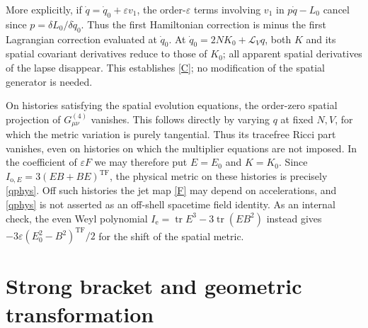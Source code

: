 \documentclass[11pt]{article}
\newcommand{\TF}{\mathop{\mathrm{TF}}}
\newcommand{\Lie}{\mathcal L}
\newcommand{\tr}{\operatorname{tr}}
\newcommand{\ep}{\varepsilon}
\begin{document}
More explicitly, if \(\dot q=\dot q_0+\ep v_1\), the order-\(\ep\) terms involving \(v_1\) in \(p\dot q-L_0\) cancel since \(p=\delta L_0/\delta\dot q_0\). Thus the first Hamiltonian correction is minus the first Lagrangian correction evaluated at \(\dot q_0\). At \(\dot q_0=2NK_0+\Lie_Vq\), both \(K\) and its spatial covariant derivatives reduce to those of \(K_0\); all apparent spatial derivatives of the lapse disappear. This establishes \eqref{C}; no modification of the spatial generator is needed.

On histories satisfying the spatial evolution equations, the order-zero spatial projection of \(G^{(4)}_{\mu\nu}\) vanishes. This follows directly by varying \(q\) at fixed \(N,V\), for which the metric variation is purely tangential. Thus its tracefree Ricci part vanishes, even on histories on which the multiplier equations are not imposed. In the coefficient of \(\ep F\) we may therefore put \(E=E_0\) and \(K=K_0\). Since \(I_{\mathrm o,E}=3(EB+BE)^{\TF}\), the physical metric on these histories is precisely \eqref{qphys}. Off such histories the jet map \eqref{F} may depend on accelerations, and \eqref{qphys} is not asserted as an off-shell spacetime field identity. As an internal check, the even Weyl polynomial
\(I_{\mathrm e}=\tr E^3-3\tr(EB^2)\)
instead gives \(-3\ep(E_0^2-B^2)^{\TF}/2\) for the shift of the spatial metric.

\section{Strong bracket and geometric transformation}
\end{document}
